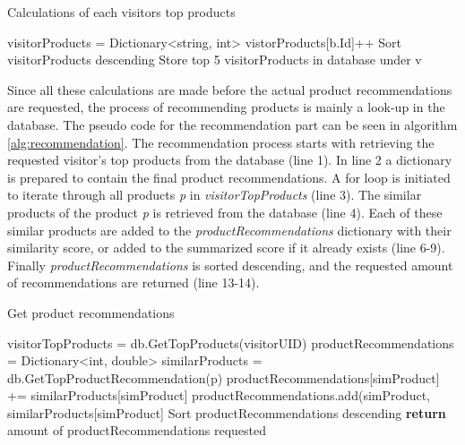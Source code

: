 \begin{algorithm}[H]
\caption{Calculations of each visitors top products}
\label{alg:topProducts}
\begin{algorithmic}[1]
\State visitorProducts = Dictionary<string, int>
\State vistorProducts[b.Id]++
\EndFor
\State Sort visitorProducts descending
\State Store top 5 visitorProducts in database under v
\EndFor
\end{algorithmic}
\end{algorithm}

Since all these calculations are made before the actual product recommendations are requested, the process of recommending products is mainly a look-up in the database. The pseudo code for the recommendation part can be seen in algorithm \ref{alg:recommendation}. The recommendation process starts with retrieving the requested visitor's top products from the database (line 1). In line 2 a dictionary is prepared to contain the final product recommendations. A for loop is initiated to iterate through all products \textit{p} in \textit{visitorTopProducts} (line 3). The similar products of the product \textit{p} is retrieved from the database (line 4). Each of these similar products are added to the \textit{productRecommendations} dictionary with their similarity score, or added to the summarized score if it already exists (line 6-9). Finally \textit{productRecommendations} is sorted descending, and the requested amount of recommendations are returned (line 13-14). 

\begin{algorithm}[H]
\caption{Get product recommendations}
\label{alg:recommendation}
\begin{algorithmic}[1]
\State visitorTopProducts = db.GetTopProducts(visitorUID)
\State productRecommendations = Dictionary<int, double>
\State similarProducts = db.GetTopProductRecommendation(p)
\State productRecommendations[simProduct] += similarProducts[simProduct]
\Else
\State productRecommendations.add(simProduct, similarProducts[simProduct]
\EndIf
\EndFor
\EndFor
\State Sort productRecommendations descending
\State \textbf{return} amount of productRecommendations requested
\State 
\end{algorithmic}
\end{algorithm}

